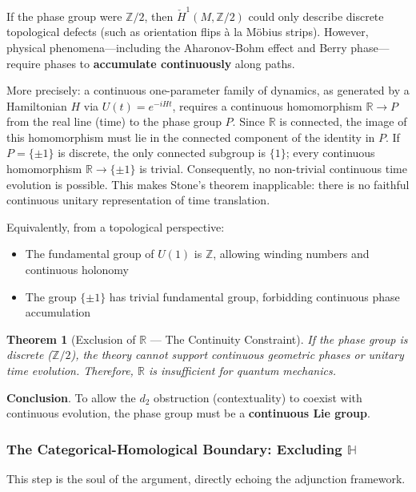 \documentclass[11pt]{article}
\newtheorem{theorem}{Theorem}[section]
\begin{document}
If the phase group were $\mathbb{Z}/2$, then $\check{H}^1(M, \mathbb{Z}/2)$ could only describe discrete topological defects (such as orientation flips \`{a} la M\"{o}bius strips). However, physical phenomena---including the Aharonov-Bohm effect and Berry phase---require phases to \textbf{accumulate continuously} along paths.

More precisely: a continuous one-parameter family of dynamics, as generated by a Hamiltonian $H$ via $U(t) = e^{-iHt}$, requires a continuous homomorphism $\mathbb{R} \to P$ from the real line (time) to the phase group $P$. Since $\mathbb{R}$ is connected, the image of this homomorphism must lie in the connected component of the identity in $P$. If $P = \{\pm 1\}$ is discrete, the only connected subgroup is $\{1\}$; every continuous homomorphism $\mathbb{R} \to \{\pm 1\}$ is trivial. Consequently, no non-trivial continuous time evolution is possible. This makes Stone's theorem inapplicable: there is no faithful continuous unitary representation of time translation.

Equivalently, from a topological perspective:
\begin{itemize}
\item The fundamental group of $U(1)$ is $\mathbb{Z}$, allowing winding numbers and continuous holonomy
\item The group $\{\pm 1\}$ has trivial fundamental group, forbidding continuous phase accumulation
\end{itemize}

\begin{theorem}[Exclusion of $\mathbb{R}$ --- The Continuity Constraint]\label{thm:exclude-r}
If the phase group is discrete ($\mathbb{Z}/2$), the theory cannot support continuous geometric phases or unitary time evolution. Therefore, $\mathbb{R}$ is insufficient for quantum mechanics.
\end{theorem}

\textbf{Conclusion}.
To allow the $d_2$ obstruction (contextuality) to coexist with continuous evolution, the phase group must be a \textbf{continuous Lie group}.

\subsubsection{The Categorical-Homological Boundary: Excluding $\mathbb{H}$}
\label{excluding-h}

This step is the soul of the argument, directly echoing the adjunction framework.
\end{document}
